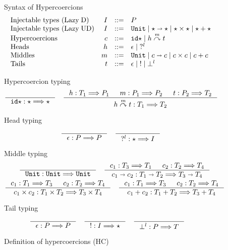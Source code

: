 \documentclass[acmsmall,review,anonymous]{acmart}\settopmatter{printfolios=true,printccs=false,printacmref=false}
\newcommand{\stxrule}[3]{\text{#2} & #1 & ::= & #3\\}
\newcommand{\plus}[0]{+}
\newcommand{\lazyUD}{Lazy\;UD}
\newcommand{\lazyD}{Lazy\;D}
\newcommand{\TOOdyn}[0]{\star}
\newcommand{\POOunit}[0]{\mathtt{Unit}}
\newcommand{\POOfun}[2]{#1 \shortrightarrow #2}
\newcommand{\POOprod}[2]{#1 \times #2}
\newcommand{\POOsum}[2]{#1 \plus #2}
\newcommand{\typingHC}[3]{#1 : #2 \Longrightarrow #3}
\newcommand{\hyperCoercionI}[0]{\mathtt{id\star}}
\newcommand{\hyperCoercionC}[3]{#1 \overset{#2}{\curvearrowright} #3}
\begin{document}
\begin{figure}
  Syntax of Hypercoercions
  \[
  \begin{array}{lrcl}
  \stxrule{I}{Injectable types (\lazyD)}{P}
  \stxrule{I}{Injectable types (\lazyUD)}{
    \POOunit \mid
    \POOfun{\TOOdyn}{\TOOdyn} \mid
    \POOprod{\TOOdyn}{\TOOdyn} \mid
    \POOsum{\TOOdyn}{\TOOdyn}
  }
  \stxrule{c}{Hypercoercions}{
    \hyperCoercionI \mid{}
    \hyperCoercionC{h}{m}{t}
  }
  \stxrule{h}{Heads}{
    \epsilon \mid{}
    ?^l
  }
  \stxrule{m}{Middles}{
    \POOunit \mid
    \POOfun{c}{c} \mid
    \POOprod{c}{c} \mid
    \POOsum{c}{c}
  }
  \stxrule{t}{Tails}{
    \epsilon \mid{}
    ! \mid{}
    \bot^l
  }
  \end{array}
  \]
    
  Hypercoercion typing 
  \begin{gather*}
  \inference{}{\typingHC{\hyperCoercionI}{\TOOdyn}{\TOOdyn}}
  \quad
  \inference{
    \typingHC{h}{T_1}{P_1} &
    \typingHC{m}{P_1}{P_2} &
    \typingHC{t}{P_2}{T_2}
  }{
    \typingHC{\hyperCoercionC{h}{m}{t}}{T_1}{T_2}
  }
  \end{gather*}
  
  Head typing \fbox{$\typingHC{h}{T}{P}$}
  \begin{gather*}
  \inference{}{\typingHC{\epsilon}{P}{P}}
  \quad
  \inference{}{\typingHC{?^l}{\TOOdyn}{I}}
  \end{gather*}
  
  Middle typing \fbox{$\typingHC{m}{T}{T}$}
  \begin{gather*}
  \inference{}{\typingHC{\POOunit}{\POOunit}{\POOunit}}
  \quad
  \inference{
    \typingHC{c_1}{T_3}{T_1} &
    \typingHC{c_2}{T_2}{T_4}
  }{
    \typingHC{\POOfun{c_1}{c_2}}{\POOfun{T_1}{T_2}}{\POOfun{T_3}{T_4}}
  }
  \\
  \inference{
    \typingHC{c_1}{T_1}{T_3} &
    \typingHC{c_2}{T_2}{T_4}
  }{
    \typingHC{\POOprod{c_1}{c_2}}{\POOprod{T_1}{T_2}}{\POOprod{T_3}{T_4}}
  }
  \quad
  \inference{
    \typingHC{c_1}{T_1}{T_3} &
    \typingHC{c_2}{T_2}{T_4}
  }{
    \typingHC{\POOsum{c_1}{c_2}}{\POOsum{T_1}{T_2}}{\POOsum{T_3}{T_4}}
  }
    \end{gather*}
    
    Tail typing \fbox{$\typingHC{t}{P}{T}$}
    \begin{gather*}
    \inference{}{\typingHC{\epsilon}{P}{P}} \quad
    \inference{}{\typingHC{!}{I}{\TOOdyn}} \quad
    \inference{}{\typingHC{\bot^l}{P}{T}} \quad
    \end{gather*}
  
  \caption{Definition of hypercoercions (HC)}
  \label{fig:hypercoercion}
\end{figure}
\end{document}
